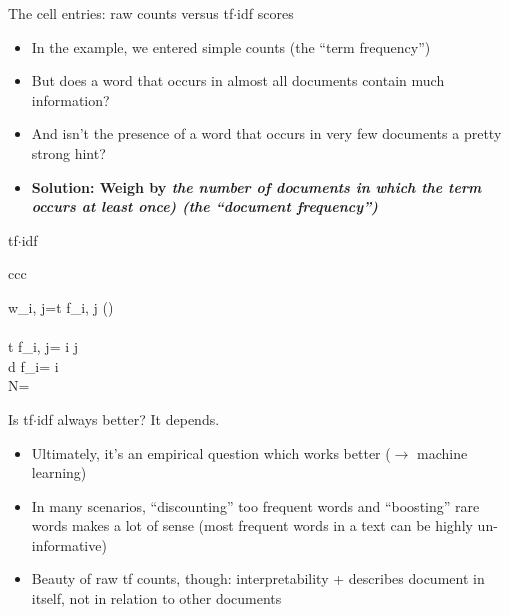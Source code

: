 \documentclass[compress]{beamer}
\begin{document}
\begin{frame}{The cell entries: raw counts versus tf$\cdot$idf scores}
	\begin{itemize}
		\item In the example, we entered simple counts (the ``term frequency'')
		\item But does a word that occurs in almost all documents contain much information?
		\item And isn't the presence of a word that occurs in very few documents a pretty strong hint?
		\item<2-> \textbf{Solution: Weigh by \emph{the number of documents in which the term occurs at least once) (the ``document frequency'')}} 
	\end{itemize}
\end{frame}

\begin{frame}{tf$\cdot$idf}
	\begin{array}{ccc}
		
		w_{i, j}=t f_{i, j} \times \log \left(\right)  \\ \\
		
		t f_{i, j}= i  j \\
		d f_{i}= i \\
		N=
	\end{array}
\end{frame}

\begin{frame}{Is tf$\cdot$idf always better?}
	It depends.
	
	\begin{itemize}
		\item Ultimately, it's an empirical question which works better ($\rightarrow$ machine learning)
		\item In many scenarios,  ``discounting'' too frequent words and ``boosting'' rare words makes a lot of sense (most frequent words in a text can be highly un-informative)
		\item Beauty of raw tf counts, though: interpretability + describes document in itself, not in relation to other documents
	\end{itemize}
\end{frame}
\end{document}
